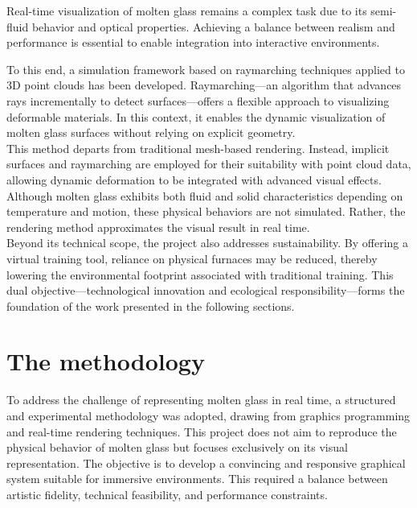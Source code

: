 \documentclass{rapportcs}
\begin{document}
    Real-time visualization of molten glass remains a complex task due to its semi-fluid behavior and optical properties. Achieving a balance between realism and performance is essential to enable integration into interactive environments.
    
    To this end, a simulation framework based on raymarching techniques applied to 3D point clouds has been developed. Raymarching—an algorithm that advances rays incrementally to detect surfaces—offers a flexible approach to visualizing deformable materials. In this context, it enables the dynamic visualization of molten glass surfaces without relying on explicit geometry. \\
    
    This method departs from traditional mesh-based rendering. Instead, implicit surfaces and raymarching are employed for their suitability with point cloud data, allowing dynamic deformation to be integrated with advanced visual effects. Although molten glass exhibits both fluid and solid characteristics depending on temperature and motion, these physical behaviors are not simulated. Rather, the rendering method approximates the visual result in real time. \\
    
    Beyond its technical scope, the project also addresses sustainability. By offering a virtual training tool, reliance on physical furnaces may be reduced, thereby lowering the environmental footprint associated with traditional training. This dual objective—technological innovation and ecological responsibility—forms the foundation of the work presented in the following sections.

\newpage


\section{The methodology}

    To address the challenge of representing molten glass in real time, a structured and experimental methodology was adopted, drawing from graphics programming and real-time rendering techniques. This project does not aim to reproduce the physical behavior of molten glass but focuses exclusively on its visual representation. The objective is to develop a convincing and responsive graphical system suitable for immersive environments. This required a balance between artistic fidelity, technical feasibility, and performance constraints.
\end{document}
